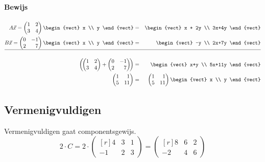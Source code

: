 \paragraph{Bewijs}
\begin{eqnarray*}
	A \vec{x} = \begin{pmatrix*}[r] 1 & 2 \\ 3 & 4 \end{pmatrix*} \begin{vect} x \\ y \end{vect} &=& \begin{vect} x + 2y \\ 3x+4y \end{vect} \\
	B \vec{x} = \begin{pmatrix*}[r] 0 & -1 \\ 2 & 7 \end{pmatrix*} \begin{vect} x \\ y \end{vect} &=& \begin{vect} -y \\ 2x+7y \end{vect} \\
	\hline \\
	\left(\!\begin{pmatrix*}[r] 1 & 2 \\ 3 & 4 \end{pmatrix*} + \begin{pmatrix*}[r] 0 & -1 \\ 2 & 7 \end{pmatrix*}\!\right) &=& \begin{vect} x+y \\ 5x+11y \end{vect} \\
	\begin{pmatrix*}[r] 1 & 1 \\ 5 & 11 \end{pmatrix*} &=& \begin{pmatrix*}[r] 1 & 1 \\ 5 & 11 \end{pmatrix*} \begin{vect} x \\ y \end{vect}
\end{eqnarray*}

\subsection{Vermenigvuldigen}
Vermenigvuldigen gaat componentsgewijs.
\[2 \cdot C = 2 \cdot \begin{pmatrix*}[r] 4 & 3 & 1 \\ -1 & 2 & 3 \end{pmatrix*} = \begin{pmatrix*}[r] 8 & 6 & 2 \\ -2 & 4 & 6 \end{pmatrix*} \]

